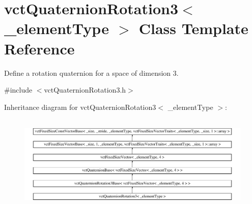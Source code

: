 \hypertarget{classvct_quaternion_rotation3}{}\section{vct\+Quaternion\+Rotation3$<$ \+\_\+element\+Type $>$ Class Template Reference}
\label{classvct_quaternion_rotation3}


Define a rotation quaternion for a space of dimension 3.  




{\ttfamily \#include $<$vct\+Quaternion\+Rotation3.\+h$>$}

Inheritance diagram for vct\+Quaternion\+Rotation3$<$ \+\_\+element\+Type $>$\+:\begin{figure}[H]
\begin{center}
\leavevmode
\includegraphics[height=4.666667cm]{d8/da7/classvct_quaternion_rotation3}
\end{center}
\end{figure}
